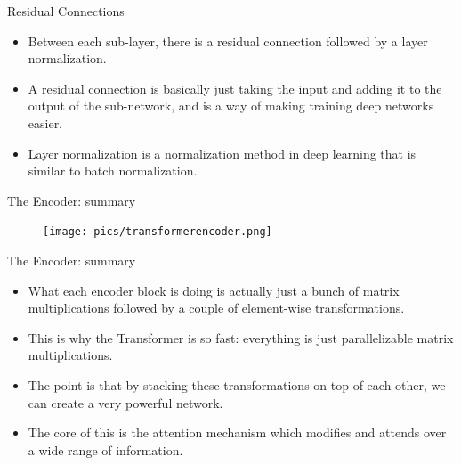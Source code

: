 \documentclass[handout]{beamer}
\begin{document}
\begin{frame}{Residual Connections}
\begin{scriptsize}
\begin{itemize}

\item Between each sub-layer, there is a residual connection followed by a layer normalization. 

\item A residual connection is basically just taking the input and adding it to the output of the sub-network, and is a way of making training deep networks easier. 

\item Layer normalization is a normalization method in deep learning that is similar to batch normalization.
 
\end{itemize}

\end{scriptsize}

\end{frame}



\begin{frame}{The Encoder: summary}

     \begin{figure}[h]
        	\texttt{[image: pics/transformerencoder.png]}
        \end{figure}  


\end{frame}

\begin{frame}{The Encoder: summary}
\begin{scriptsize}
\begin{itemize}

 \item  What each encoder block is doing is actually just a bunch of matrix multiplications followed by a couple of element-wise transformations.
 
 \item This is why the Transformer is so fast: everything is just parallelizable matrix multiplications.
 
 \item The point is that by stacking these transformations on top of each other, we can create a very powerful network. 
 
 \item The core of this is the attention mechanism which modifies and attends over a wide range of information.
 
\end{itemize}

\end{scriptsize}

\end{frame}
\end{document}
